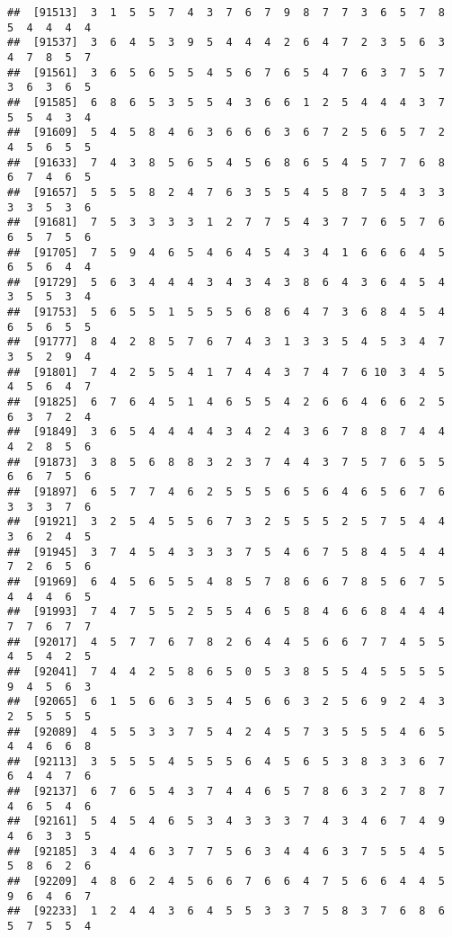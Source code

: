 \documentclass[
]{book}
\begin{document}
\begin{verbatim}
##  [91513]  3  1  5  5  7  4  3  7  6  7  9  8  7  7  3  6  5  7  8  5  4  4  4  4
##  [91537]  3  6  4  5  3  9  5  4  4  4  2  6  4  7  2  3  5  6  3  4  7  8  5  7
##  [91561]  3  6  5  6  5  5  4  5  6  7  6  5  4  7  6  3  7  5  7  3  6  3  6  5
##  [91585]  6  8  6  5  3  5  5  4  3  6  6  1  2  5  4  4  4  3  7  5  5  4  3  4
##  [91609]  5  4  5  8  4  6  3  6  6  6  3  6  7  2  5  6  5  7  2  4  5  6  5  5
##  [91633]  7  4  3  8  5  6  5  4  5  6  8  6  5  4  5  7  7  6  8  6  7  4  6  5
##  [91657]  5  5  5  8  2  4  7  6  3  5  5  4  5  8  7  5  4  3  3  3  3  5  3  6
##  [91681]  7  5  3  3  3  3  1  2  7  7  5  4  3  7  7  6  5  7  6  6  5  7  5  6
##  [91705]  7  5  9  4  6  5  4  6  4  5  4  3  4  1  6  6  6  4  5  6  5  6  4  4
##  [91729]  5  6  3  4  4  4  3  4  3  4  3  8  6  4  3  6  4  5  4  3  5  5  3  4
##  [91753]  5  6  5  5  1  5  5  5  6  8  6  4  7  3  6  8  4  5  4  6  5  6  5  5
##  [91777]  8  4  2  8  5  7  6  7  4  3  1  3  3  5  4  5  3  4  7  3  5  2  9  4
##  [91801]  7  4  2  5  5  4  1  7  4  4  3  7  4  7  6 10  3  4  5  4  5  6  4  7
##  [91825]  6  7  6  4  5  1  4  6  5  5  4  2  6  6  4  6  6  2  5  6  3  7  2  4
##  [91849]  3  6  5  4  4  4  4  3  4  2  4  3  6  7  8  8  7  4  4  4  2  8  5  6
##  [91873]  3  8  5  6  8  8  3  2  3  7  4  4  3  7  5  7  6  5  5  6  6  7  5  6
##  [91897]  6  5  7  7  4  6  2  5  5  5  6  5  6  4  6  5  6  7  6  3  3  3  7  6
##  [91921]  3  2  5  4  5  5  6  7  3  2  5  5  5  2  5  7  5  4  4  3  6  2  4  5
##  [91945]  3  7  4  5  4  3  3  3  7  5  4  6  7  5  8  4  5  4  4  7  2  6  5  6
##  [91969]  6  4  5  6  5  5  4  8  5  7  8  6  6  7  8  5  6  7  5  4  4  4  6  5
##  [91993]  7  4  7  5  5  2  5  5  4  6  5  8  4  6  6  8  4  4  4  7  7  6  7  7
##  [92017]  4  5  7  7  6  7  8  2  6  4  4  5  6  6  7  7  4  5  5  4  5  4  2  5
##  [92041]  7  4  4  2  5  8  6  5  0  5  3  8  5  5  4  5  5  5  5  9  4  5  6  3
##  [92065]  6  1  5  6  6  3  5  4  5  6  6  3  2  5  6  9  2  4  3  2  5  5  5  5
##  [92089]  4  5  5  3  3  7  5  4  2  4  5  7  3  5  5  5  4  6  5  4  4  6  6  8
##  [92113]  3  5  5  5  4  5  5  5  6  4  5  6  5  3  8  3  3  6  7  6  4  4  7  6
##  [92137]  6  7  6  5  4  3  7  4  4  6  5  7  8  6  3  2  7  8  7  4  6  5  4  6
##  [92161]  5  4  5  4  6  5  3  4  3  3  3  7  4  3  4  6  7  4  9  4  6  3  3  5
##  [92185]  3  4  4  6  3  7  7  5  6  3  4  4  6  3  7  5  5  4  5  5  8  6  2  6
##  [92209]  4  8  6  2  4  5  6  6  7  6  6  4  7  5  6  6  4  4  5  9  6  4  6  7
##  [92233]  1  2  4  4  3  6  4  5  5  3  3  7  5  8  3  7  6  8  6  5  7  5  5  4

\end{verbatim}
\end{document}
